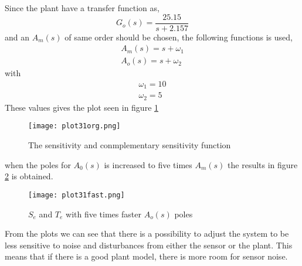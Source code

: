 Since the plant have a transfer function as,
\begin{equation}
  G_o(s)=\frac{25.15}{s+2.157}
\end{equation}
and an $A_m(s)$ of same order should be chosen, the following functions is
used,
\begin{align*}
    A_m(s)=s+\omega_1 \\
    A_o(s)=s+\omega_2
\end{align*}
with
\begin{align*}
    \omega_1 = 10 \\
    \omega_2 = 5
\end{align*}
These values gives the plot seen in figure \ref{fig:sens31org}
\begin{figure}[H]
  \centering
  \texttt{[image: plot31org.png]}
  \caption{The sensitivity and conmplementary sensitivity function}
  \label{fig:sens31org}
\end{figure}
when the poles for $A_0(s)$ is increased to five times $A_m(s)$ the
results in figure \ref{fig:sens31fast} is obtained. 
\begin{figure}[H]
    \centering
    \texttt{[image: plot31fast.png]}
    \caption{$S_e$ and $T_e$ with five times faster $A_o(s)$ poles}
    \label{fig:sens31fast}
\end{figure}
From the plots we can see that there is a possibility to adjust the
system to be less sensitive to noise and disturbances from either the
sensor or the plant. This means that if there is a good plant model,
there is more room for sensor noise.
